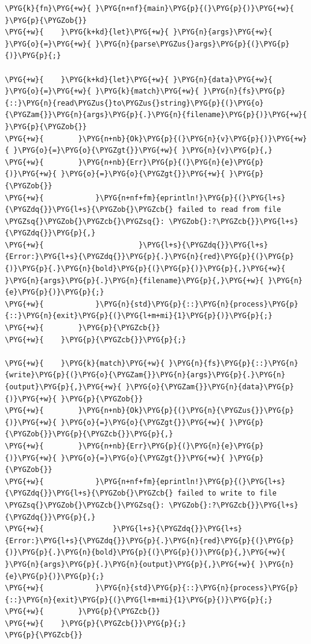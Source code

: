 \begin{Verbatim}[commandchars=\\\{\},breaklines=true,breakanywhere=true,fontsize=\codefont,xleftmargin=17bp]
\PYG{k}{fn}\PYG{+w}{ }\PYG{n+nf}{main}\PYG{p}{(}\PYG{p}{)}\PYG{+w}{ }\PYG{p}{\PYGZob{}}
\PYG{+w}{    }\PYG{k+kd}{let}\PYG{+w}{ }\PYG{n}{args}\PYG{+w}{ }\PYG{o}{=}\PYG{+w}{ }\PYG{n}{parse\PYGZus{}args}\PYG{p}{(}\PYG{p}{)}\PYG{p}{;}

\PYG{+w}{    }\PYG{k+kd}{let}\PYG{+w}{ }\PYG{n}{data}\PYG{+w}{ }\PYG{o}{=}\PYG{+w}{ }\PYG{k}{match}\PYG{+w}{ }\PYG{n}{fs}\PYG{p}{::}\PYG{n}{read\PYGZus{}to\PYGZus{}string}\PYG{p}{(}\PYG{o}{\PYGZam{}}\PYG{n}{args}\PYG{p}{.}\PYG{n}{filename}\PYG{p}{)}\PYG{+w}{ }\PYG{p}{\PYGZob{}}
\PYG{+w}{        }\PYG{n+nb}{Ok}\PYG{p}{(}\PYG{n}{v}\PYG{p}{)}\PYG{+w}{ }\PYG{o}{=}\PYG{o}{\PYGZgt{}}\PYG{+w}{ }\PYG{n}{v}\PYG{p}{,}
\PYG{+w}{        }\PYG{n+nb}{Err}\PYG{p}{(}\PYG{n}{e}\PYG{p}{)}\PYG{+w}{ }\PYG{o}{=}\PYG{o}{\PYGZgt{}}\PYG{+w}{ }\PYG{p}{\PYGZob{}}
\PYG{+w}{            }\PYG{n+nf+fm}{eprintln!}\PYG{p}{(}\PYG{l+s}{\PYGZdq{}}\PYG{l+s}{\PYGZob{}\PYGZcb{} failed to read from file \PYGZsq{}\PYGZob{}\PYGZcb{}\PYGZsq{}: \PYGZob{}:?\PYGZcb{}}\PYG{l+s}{\PYGZdq{}}\PYG{p}{,}
\PYG{+w}{                      }\PYG{l+s}{\PYGZdq{}}\PYG{l+s}{Error:}\PYG{l+s}{\PYGZdq{}}\PYG{p}{.}\PYG{n}{red}\PYG{p}{(}\PYG{p}{)}\PYG{p}{.}\PYG{n}{bold}\PYG{p}{(}\PYG{p}{)}\PYG{p}{,}\PYG{+w}{ }\PYG{n}{args}\PYG{p}{.}\PYG{n}{filename}\PYG{p}{,}\PYG{+w}{ }\PYG{n}{e}\PYG{p}{)}\PYG{p}{;}
\PYG{+w}{            }\PYG{n}{std}\PYG{p}{::}\PYG{n}{process}\PYG{p}{::}\PYG{n}{exit}\PYG{p}{(}\PYG{l+m+mi}{1}\PYG{p}{)}\PYG{p}{;}
\PYG{+w}{        }\PYG{p}{\PYGZcb{}}
\PYG{+w}{    }\PYG{p}{\PYGZcb{}}\PYG{p}{;}

\PYG{+w}{    }\PYG{k}{match}\PYG{+w}{ }\PYG{n}{fs}\PYG{p}{::}\PYG{n}{write}\PYG{p}{(}\PYG{o}{\PYGZam{}}\PYG{n}{args}\PYG{p}{.}\PYG{n}{output}\PYG{p}{,}\PYG{+w}{ }\PYG{o}{\PYGZam{}}\PYG{n}{data}\PYG{p}{)}\PYG{+w}{ }\PYG{p}{\PYGZob{}}
\PYG{+w}{        }\PYG{n+nb}{Ok}\PYG{p}{(}\PYG{n}{\PYGZus{}}\PYG{p}{)}\PYG{+w}{ }\PYG{o}{=}\PYG{o}{\PYGZgt{}}\PYG{+w}{ }\PYG{p}{\PYGZob{}}\PYG{p}{\PYGZcb{}}\PYG{p}{,}
\PYG{+w}{        }\PYG{n+nb}{Err}\PYG{p}{(}\PYG{n}{e}\PYG{p}{)}\PYG{+w}{ }\PYG{o}{=}\PYG{o}{\PYGZgt{}}\PYG{+w}{ }\PYG{p}{\PYGZob{}}
\PYG{+w}{            }\PYG{n+nf+fm}{eprintln!}\PYG{p}{(}\PYG{l+s}{\PYGZdq{}}\PYG{l+s}{\PYGZob{}\PYGZcb{} failed to write to file \PYGZsq{}\PYGZob{}\PYGZcb{}\PYGZsq{}: \PYGZob{}:?\PYGZcb{}}\PYG{l+s}{\PYGZdq{}}\PYG{p}{,}
\PYG{+w}{                }\PYG{l+s}{\PYGZdq{}}\PYG{l+s}{Error:}\PYG{l+s}{\PYGZdq{}}\PYG{p}{.}\PYG{n}{red}\PYG{p}{(}\PYG{p}{)}\PYG{p}{.}\PYG{n}{bold}\PYG{p}{(}\PYG{p}{)}\PYG{p}{,}\PYG{+w}{ }\PYG{n}{args}\PYG{p}{.}\PYG{n}{output}\PYG{p}{,}\PYG{+w}{ }\PYG{n}{e}\PYG{p}{)}\PYG{p}{;}
\PYG{+w}{            }\PYG{n}{std}\PYG{p}{::}\PYG{n}{process}\PYG{p}{::}\PYG{n}{exit}\PYG{p}{(}\PYG{l+m+mi}{1}\PYG{p}{)}\PYG{p}{;}
\PYG{+w}{        }\PYG{p}{\PYGZcb{}}
\PYG{+w}{    }\PYG{p}{\PYGZcb{}}\PYG{p}{;}
\PYG{p}{\PYGZcb{}}
\end{Verbatim}

